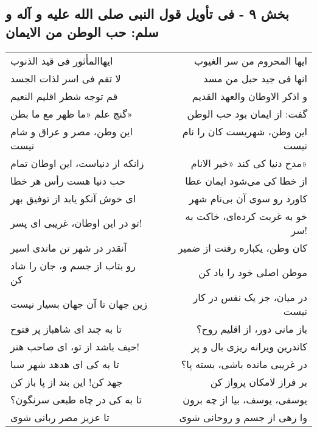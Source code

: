 \begin{center}
\section*{بخش ۹ - فی تأویل قول النبی صلی الله علیه و آله و سلم: حب الوطن من الایمان}
\label{sec:009}
\begin{longtable}{l p{0.5cm} r}
ایهاالمأثور فی قید الذنوب
&&
ایها المحروم من سر الغیوب
\\
لا تقم فی اسر لذات الجسد
&&
انها فی جید حبل من مسد
\\
قم توجه شطر اقلیم النعیم
&&
و اذکر الاوطان والعهد القدیم
\\
گنج علم «ما ظهر مع ما بطن»
&&
گفت: از ایمان بود حب الوطن
\\
این وطن، مصر و عراق و شام نیست
&&
این وطن، شهریست کان را نام نیست
\\
زانکه از دنیاست، این اوطان تمام
&&
مدح دنیا کی کند «خیر الانام»
\\
حب دنیا هست رأس هر خطا
&&
از خطا کی می‌شود ایمان عطا
\\
ای خوش آنکو یابد از توفیق بهر
&&
کاورد رو سوی آن بی‌نام شهر
\\
تو در این اوطان، غریبی ای پسر!
&&
خو به غربت کرده‌ای، خاکت به سر!
\\
آنقدر در شهر تن ماندی اسیر
&&
کان وطن، یکباره رفتت از ضمیر
\\
رو بتاب از جسم و، جان را شاد کن
&&
موطن اصلی خود را یاد کن
\\
زین جهان تا آن جهان بسیار نیست
&&
در میان، جز یک نفس در کار نیست
\\
تا به چند ای شاهباز پر فتوح
&&
باز مانی دور، از اقلیم روح؟
\\
حیف باشد از تو، ای صاحب هنر!
&&
کاندرین ویرانه ریزی بال و پر
\\
تا به کی ای هدهد شهر سبا
&&
در غریبی مانده باشی، بسته پا؟
\\
جهد کن! این بند از پا باز کن
&&
بر فراز لامکان پرواز کن
\\
تا به کی در چاه طبعی سرنگون؟
&&
یوسفی، یوسف، بیا از چه برون
\\
تا عزیز مصر ربانی شوی
&&
وا رهی از جسم و روحانی شوی
\\
\end{longtable}
\end{center}
